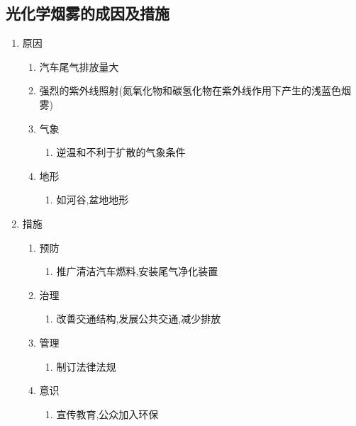 \documentclass[a4paper]{article}
\begin{document}
    \subsection{光化学烟雾的成因及措施}
    \begin{enumerate}
        \item 原因
        \begin{enumerate}
            \item 汽车尾气排放量大
            \item 强烈的紫外线照射(氮氧化物和碳氢化物在紫外线作用下产生的浅蓝色烟雾)
            \item 气象
            \begin{enumerate}
                \item 逆温和不利于扩散的气象条件
            \end{enumerate}
            \item 地形
            \begin{enumerate}
                \item 如河谷,盆地地形
            \end{enumerate}
        \end{enumerate}
        \item 措施
        \begin{enumerate}
            \item 预防
            \begin{enumerate}
                \item 推广清洁汽车燃料,安装尾气净化装置
            \end{enumerate}
            \item 治理
            \begin{enumerate}
                \item 改善交通结构,发展公共交通,减少排放
            \end{enumerate}
            \item 管理
            \begin{enumerate}
                \item 制订法律法规
            \end{enumerate}
            \item 意识
            \begin{enumerate}
                \item 宣传教育,公众加入环保
            \end{enumerate}
        \end{enumerate}
    \end{enumerate}
\end{document}

